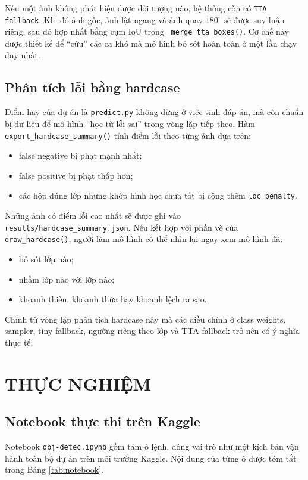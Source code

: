 \documentclass[12pt,a4paper]{article}
\begin{document}
Nếu một ảnh không phát hiện được đối tượng nào, hệ thống còn có \texttt{TTA fallback}. Khi đó ảnh gốc, ảnh lật ngang và ảnh quay $180^\circ$ sẽ được suy luận riêng, sau đó hợp nhất bằng cụm IoU trong \texttt{\_merge\_tta\_boxes()}. Cơ chế này được thiết kế để ``cứu'' các ca khó mà mô hình bỏ sót hoàn toàn ở một lần chạy duy nhất.

\subsection{Phân tích lỗi bằng hardcase}
Điểm hay của dự án là \texttt{predict.py} không dừng ở việc sinh đáp án, mà còn chuẩn bị dữ liệu để mô hình ``học từ lỗi sai'' trong vòng lặp tiếp theo. Hàm \texttt{export\_hardcase\_summary()} tính điểm lỗi theo từng ảnh dựa trên:
\begin{itemize}
    \item false negative bị phạt mạnh nhất;
    \item false positive bị phạt thấp hơn;
    \item các hộp đúng lớp nhưng khớp hình học chưa tốt bị cộng thêm \texttt{loc\_penalty}.
\end{itemize}

Những ảnh có điểm lỗi cao nhất sẽ được ghi vào \texttt{results/hardcase\_summary.json}. Nếu kết hợp với phần vẽ của \texttt{draw\_hardcase()}, người làm mô hình có thể nhìn lại ngay xem mô hình đã:
\begin{itemize}
    \item bỏ sót lớp nào;
    \item nhầm lớp nào với lớp nào;
    \item khoanh thiếu, khoanh thừa hay khoanh lệch ra sao.
\end{itemize}
Chính từ vòng lặp phân tích hardcase này mà các điều chỉnh ở class weights, sampler, tiny fallback, ngưỡng riêng theo lớp và TTA fallback trở nên có ý nghĩa thực tế.

\section{THỰC NGHIỆM}

\subsection{Notebook thực thi trên Kaggle}
Notebook \texttt{obj-detec.ipynb} gồm tám ô lệnh, đóng vai trò như một kịch bản vận hành toàn bộ dự án trên môi trường Kaggle. Nội dung của từng ô được tóm tắt trong Bảng \ref{tab:notebook}.
\end{document}
